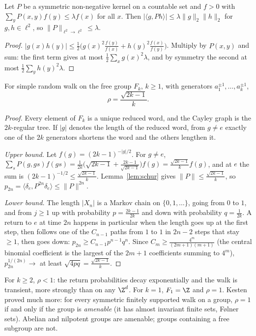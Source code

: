 \begin{lemma}\label{lem:schur}
Let $P$ be a symmetric non-negative kernel on a countable set and $f>0$ with $\sum_yP(x,y)f(y)\le\lambda f(x)$ for all $x$. Then $|\langle g,Ph\rangle|\le\lambda\|g\|_2\|h\|_2$ for $g,h\in\ell^2$, so $\|P\|_{\ell^2\to\ell^2}\le\lambda$.
\end{lemma}

\begin{proof}
$|g(x)h(y)|\le\frac12\bigl(g(x)^2\frac{f(y)}{f(x)}+h(y)^2\frac{f(x)}{f(y)}\bigr)$. Multiply by $P(x,y)$ and sum: the first term gives at most $\frac12\sum_xg(x)^2\lambda$, and by symmetry the second at most $\frac12\sum_yh(y)^2\lambda$.
\end{proof}

\begin{theorem}[Kesten, 1959]\label{thm:kesten}
For simple random walk on the free group $F_k$, $k\ge1$, with generators $a_1^{\pm1},\dots,a_k^{\pm1}$,
\[
\rho=\frac{\sqrt{2k-1}}k .
\]
\end{theorem}

\begin{proof}
Every element of $F_k$ is a unique reduced word, and the Cayley graph is the $2k$-regular tree. If $|g|$ denotes the length of the reduced word, from $g\ne e$ exactly one of the $2k$ generators shortens the word and the
others lengthen it.

\emph{Upper bound.} Let $f(g)=(2k-1)^{-|g|/2}$. For $g\ne e$, $\sum_sP(g,gs)f(gs)=\frac1{2k}\bigl(\sqrt{2k-1}+\frac{2k-1}{\sqrt{2k-1}}\bigr)f(g)=\frac{\sqrt{2k-1}}kf(g)$, and at $e$ the sum is $(2k-1)^{-1/2}\le\frac{\sqrt{2k-1}}k$. Lemma~\ref{lem:schur}
gives $\|P\|\le\frac{\sqrt{2k-1}}k$, so $p_{2n}=\langle\delta_e,P^{2n}\delta_e\rangle\le\|P\|^{2n}$.

\emph{Lower bound.} The length $|X_n|$ is a Markov chain on $\{0,1,\dots\}$, going from $0$ to $1$, and from $j\ge1$ up with probability $p=\frac{2k-1}{2k}$ and down with probability $q=\frac1{2k}$. A return to $e$ at time $2n$
happens in particular when the length goes up at the first step, then follows one of the $C_{n-1}$ paths from $1$ to $1$ in $2n-2$ steps that stay $\ge1$, then goes down: $p_{2n}\ge C_{n-1}p^{n-1}q^n$. Since
$C_m\ge\frac{4^m}{(2m+1)(m+1)}$ (the central binomial coefficient is the largest of the $2m+1$ coefficients summing to $4^m$), $p_{2n}^{1/(2n)}\to$ at least $\sqrt{4pq}=\frac{\sqrt{2k-1}}k$.
\end{proof}

For $k\ge2$, $\rho<1$: the return probabilities decay exponentially and the walk is transient, more strongly than on any $\Z^d$. For $k=1$, $F_1=\Z$ and $\rho=1$. Kesten proved much more: for every symmetric finitely
supported walk on a group, $\rho=1$ if and only if the group is \emph{amenable} (it has almost invariant finite sets, F\o lner sets). Abelian and nilpotent groups are amenable; groups containing a free subgroup
are not.


